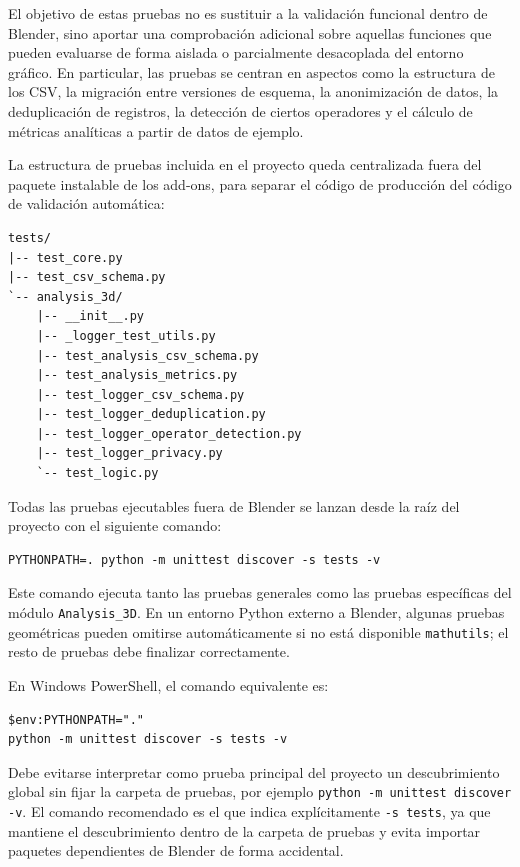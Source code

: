 El objetivo de estas pruebas no es sustituir a la validación funcional dentro de Blender, sino aportar una comprobación adicional sobre aquellas funciones que pueden evaluarse de forma aislada o parcialmente desacoplada del entorno gráfico. En particular, las pruebas se centran en aspectos como la estructura de los CSV, la migración entre versiones de esquema, la anonimización de datos, la deduplicación de registros, la detección de ciertos operadores y el cálculo de métricas analíticas a partir de datos de ejemplo.

La estructura de pruebas incluida en el proyecto queda centralizada fuera del paquete instalable de los add-ons, para separar el código de producción del código de validación automática:

\begin{verbatim}
tests/
|-- test_core.py
|-- test_csv_schema.py
`-- analysis_3d/
    |-- __init__.py
    |-- _logger_test_utils.py
    |-- test_analysis_csv_schema.py
    |-- test_analysis_metrics.py
    |-- test_logger_csv_schema.py
    |-- test_logger_deduplication.py
    |-- test_logger_operator_detection.py
    |-- test_logger_privacy.py
    `-- test_logic.py
\end{verbatim}

Todas las pruebas ejecutables fuera de Blender se lanzan desde la raíz del proyecto con el siguiente comando:

\begin{verbatim}
PYTHONPATH=. python -m unittest discover -s tests -v
\end{verbatim}

Este comando ejecuta tanto las pruebas generales como las pruebas específicas del módulo \texttt{Analysis\_3D}. En un entorno Python externo a Blender, algunas pruebas geométricas pueden omitirse automáticamente si no está disponible \texttt{mathutils}; el resto de pruebas debe finalizar correctamente.

En Windows PowerShell, el comando equivalente es:

\begin{verbatim}
$env:PYTHONPATH="."
python -m unittest discover -s tests -v
\end{verbatim}

Debe evitarse interpretar como prueba principal del proyecto un descubrimiento global sin fijar la carpeta de pruebas, por ejemplo \texttt{python -m unittest discover -v}. El comando recomendado es el que indica explícitamente \texttt{-s tests}, ya que mantiene el descubrimiento dentro de la carpeta de pruebas y evita importar paquetes dependientes de Blender de forma accidental.

